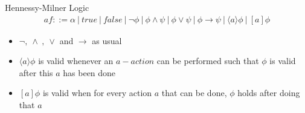 \documentclass[aspectratio=1610]{beamer}
\begin{document}
  \begin{frame}{Hennessy-Milner Logic}
    \begin{align*}
      af ::= \alpha\ |\ true\ |\ false\ |\ \neg \phi\ |\ \phi \land \psi\ |\ \phi \lor \psi\ |\ \phi \to \psi\ |\ \langle a \rangle \phi \ |\ [a]\phi
    \end{align*}
    \begin{itemize}
      \item $\neg ,\ \land\ ,\ \lor$ and $\to$ as usual
      \item $\langle a \rangle \phi$ is valid whenever an $a-action$ can be performed such that $\phi$ is valid after this $a$ has been done
      \item $[a]\phi$ is valid when for every action $a$ that can be done, $\phi$ holds after doing that $a$
    \end{itemize}
  \end{frame}
\end{document}
